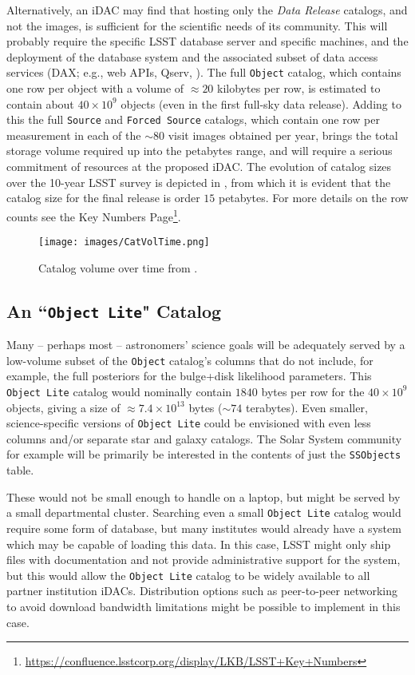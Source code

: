 Alternatively, an iDAC may find that hosting only the {\it Data Release} catalogs, and not the images, is sufficient for the scientific needs of its community. This will probably require the specific LSST database server  and specific machines, and the deployment of the database system and the associated subset of data access services (DAX; e.g., web APIs, Qserv, ). The full {\tt Object} catalog, which contains one row per object with a volume of $\approx 20$ kilobytes per row, is estimated to contain about $40 \times 10^9$ objects (even in the first full-sky data release). Adding to this the full {\tt Source} and {\tt Forced Source} catalogs, which contain one row per measurement in each of the $\sim80$ visit images obtained per year, brings the total storage volume required up into the petabytes range, and will require a serious commitment of resources at the proposed iDAC. The evolution of catalog sizes over the 10-year LSST survey is depicted in , from which it is evident that the catalog size for the final release is order $15$ petabytes. For more details on the row counts see the Key Numbers Page\footnote{\url{https://confluence.lsstcorp.org/display/LKB/LSST+Key+Numbers}}.

\begin{figure}
\begin{center}
\texttt{[image: images/CatVolTime.png]}
\caption{Catalog volume over time from . \label{fig:catvol}}
\end{center}
\end{figure}

\subsection{An ``{\tt Object Lite}" Catalog}\label{sec:lite}

Many -- perhaps most -- astronomers' science goals will be adequately served by a low-volume subset of the {\tt Object} catalog's columns that do not include, for example, the full posteriors for the bulge+disk likelihood parameters.
This {\tt Object Lite} catalog would nominally contain $1840$ bytes per row for the $40 \times 10^{9}$ objects, giving a size of $\approx 7.4 \times 10^{13}$ bytes ($\sim74$ terabytes).
Even smaller, science-specific versions of {\tt Object Lite} could be envisioned with even less columns and/or separate star and galaxy catalogs.
The Solar System community for example will be primarily be interested in the contents of  just the  {\tt SSObjects} table.

These would not be small enough to handle on a laptop, but might be served by a small departmental cluster.
Searching even a small {\tt Object Lite} catalog would require some form of database, but many institutes would already have a system which may be capable of loading this data.
In this case, LSST might only ship files with documentation and not provide administrative support for the system, but this would allow the {\tt Object Lite} catalog to be widely available to all partner institution iDACs. Distribution options such as peer-to-peer networking to avoid download bandwidth limitations might be possible to implement in this case.

